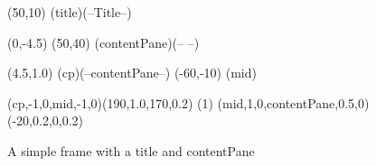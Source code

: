 


\begin {figure}

\Draw


\MinNodeSize(50,10)
\RectNode(title)(--Title--)

\MoveToExit(0,-4.5)
\MinNodeSize(50,40)
\RectNode(contentPane)(-- --)

\MoveToExit(4.5,1.0)
\Node(cp)(--contentPane--)
\Move(-60,-10)
\FcNode(mid)


\CurvedEdgeAt(cp,-1,0,mid,-1,0)(190,1.0,170,0.2)
\ArrowHeads(1)
\CurvedEdgeAt(mid,1,0,contentPane,0.5,0)(-20,0.2,0,0.2)


\EndDraw

\caption {A simple frame with a title and contentPane}

\label {fig:frame1}

\end {figure}

